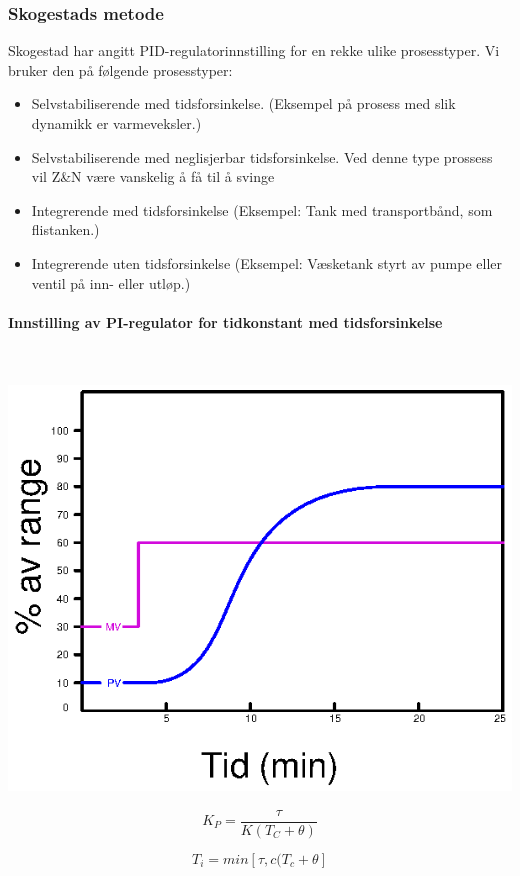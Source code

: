 \documentclass[10pt,a5paper]{article}
\begin{document}
\subsubsection{Skogestads metode}

Skogestad har angitt PID-regulatorinnstilling for en rekke ulike prosesstyper. Vi bruker den på følgende prosesstyper:
\begin{itemize}
\item Selvstabiliserende med tidsforsinkelse. (Eksempel på
prosess med slik dynamikk er varmeveksler.)
\item Selvstabiliserende med neglisjerbar tidsforsinkelse. Ved denne type prossess vil Z\&N være vanskelig å få til å svinge
\item Integrerende med tidsforsinkelse 
(Eksempel: Tank med transportbånd, som flistanken.)
\item Integrerende uten tidsforsinkelse (Eksempel: Væsketank styrt av pumpe eller ventil på inn- eller utløp.)
\end{itemize}

\paragraph{Innstilling av PI-regulator for tidkonstant med tidsforsinkelse}

~

\includegraphics{Sprang_selvregulerende.eps}

\[
K_{P}=\dfrac{\tau}{K\left(T_{C}+\theta\right)}
\]

\[
T_{i}=min[\tau,c(T_{c}+\theta]
\]
\end{document}
